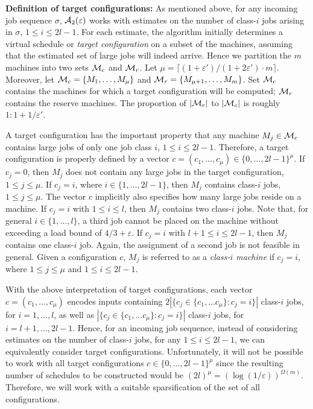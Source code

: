 \documentclass{llncs}
\newcommand{\eps}{\varepsilon}
\begin{document}
{\bf Definition of target configurations:} As mentioned above, for any incoming job sequence $\sigma$, 
${\cal A}_2(\eps)$ works with estimates on the number of class-$i$ jobs arising in $\sigma$, $1\leq i \leq 2l-1$. 
For each estimate, the algorithm initially determines a virtual schedule or {\em target configuration\/} on a 
subset of the machines, assuming that the estimated set of large jobs will indeed arrive. Hence we partition the 
$m$ machines into two sets ${\cal M}_c$ and ${\cal M}_r$. Let $\mu = \lceil (1+\eps')/(1+2\eps')\cdot m\rceil$. Moreover, 
let ${\cal M}_c =\{M_1, \ldots, M_{\mu}\}$ and ${\cal M}_r =\{M_{\mu+1}, \ldots, M_m\}$. Set ${\cal M}_c$ 
contains the machines for which a target configuration will be computed; ${\cal M}_r$ contains the 
reserve machines. The proportion of  $|{\cal M}_r|$ to $|{\cal M}_c|$  is roughly $1:1+1/\eps'$.

A target configuration has the important property that any machine $M_j\in {\cal M}_c$ contains large jobs
of only one job class $i$, $1\leq i \leq 2l-1$. Therefore, a target configuration is properly defined
by a vector $c = (c_1, \ldots, c_{\mu}) \in \{0,\ldots,2l-1\}^{\mu}$. If $c_j=0$, then $M_j$ does not contain 
any large jobs in the target configuration, $1\leq j\leq \mu$. If  $c_j=i$, where 
$i\in \{1,\ldots, 2l-1\}$, then $M_j$ contains class-$i$ jobs, $1\leq j\leq \mu$. The vector $c$ 
implicitly also specifies how many large jobs reside on a machine. If $c_j=i$ with $1\leq i \leq l$, then
$M_j$ contains two class-$i$ jobs. Note that, for general $i\in \{1,\ldots, l\}$, a third job cannot be 
placed on the machine without exceeding a load bound of $4/3+\eps$. If $c_j=i$ with $l+1\leq i \leq 2l-1$, then
$M_j$ contains one class-$i$ job. Again, the assignment of a second job is not feasible in general. 
Given a configuration $c$, $M_j$ is referred to as a {\em class-$i$ machine} if $c_j=i$, where
$1\leq j \leq \mu$ and $1\leq i \leq 2l-1$. 

With the above interpretation of target configurations, each vector  $c = (c_1, \ldots, c_{\mu})$ encodes
inputs containing $2|\{c_j \in\{c_1,\ldots c_{\mu}\} : c_j=i\}|$ class-$i$ jobs, for $i=1,\ldots, l$, as
well as  $|\{c_j\in \{c_1,\ldots c_{\mu}\} : c_j=i\}|$ class-$i$ jobs, for $i=l+1,\ldots, 2l-1$.  Hence,
for an incoming job sequence, instead of considering estimates on the number of class-$i$ jobs, for any
$1\leq i \leq 2l-1$, we can equivalently consider target configurations. Unfortunately, it
will not be possible to work with all target configurations $c\in \{0,\ldots,2l-1\}^{\mu}$ since the
resulting number of schedules to be constructed would be $(2l)^{\mu} = (\log(1/\eps))^{\Omega(m)}$.
Therefore, we will work with a suitable sparsification of the set of all configurations.
\end{document}
